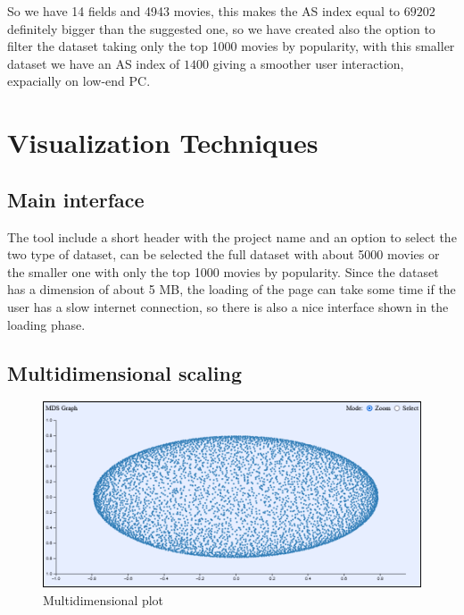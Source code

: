\documentclass[]{article}
\begin{document}
So we have 14 fields and 4943 movies, this makes the AS index equal to $69202$ definitely bigger than the suggested one, so we have created also the option to filter the dataset taking only the top 1000 movies by popularity, with this smaller dataset we have an AS index of $1400$ giving a smoother user interaction, expacially on low-end PC.\newline
\section{Visualization Techniques}
\subsection{Main interface}
The tool include a short header with the project name and an option to select the two type of dataset, can be selected the full dataset with about 5000 movies or the smaller one with only the top 1000 movies by popularity.\newline
Since the dataset has a dimension of about 5 MB, the loading of the page can take some time if the user has a slow internet connection, so there is also a nice interface shown in the loading phase.
\subsection{Multidimensional scaling}
\begin{figure}[H]
	\centering
	\includegraphics[width=1\linewidth]{images/mds_plot}
	\caption{Multidimensional plot}
	\label{fig:mdsplot}
\end{figure}
\end{document}
